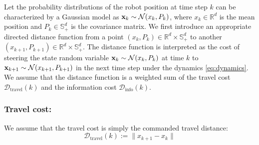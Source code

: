 \documentclass[Afour,sageh,times]{sagej}
\newcommand{\bx}{{\bf x}}
\begin{document}
Let the probability distributions of the robot position at time step $k$ can be characterized by a Gaussian model as $\bx_k\sim\mathcal{N}(x_k, P_k)$, where $x_k\in\mathbb{R}^d$ is the mean position and $P_k\in \mathbb{S}_{+}^d$ is the covariance matrix. 
We first introduce an appropriate directed distance function from a point $(x_k, P_k)\in \mathbb{R}^d \times \mathbb{S}_{+}^d$  to another $(x_{k+1}, P_{k+1})\in \mathbb{R}^d \times \mathbb{S}_{+}^d$. 
The distance function is interpreted as the cost of steering the state random variable $\bx_k\sim\mathcal{N}(x_k, P_k)$ at time $k$ to $\bx_{k+1}\sim\mathcal{N}(x_{k+1}, P_{k+1})$ in the next time step under the dynamics \eqref{eq:dynamics}. 
We assume that the distance function is a weighted sum of the travel cost $\mathcal{D}_{\text{travel}}(k)$ and the information cost $\mathcal{D}_{\text{info}}(k)$.

\subsubsection{Travel cost:}
We assume that the travel cost is simply the commanded travel distance:
\[
\mathcal{D}_{\text{travel}}(k):=\|x_{k+1}-x_k\|
\]
\end{document}
